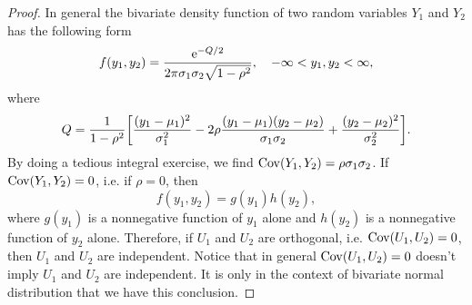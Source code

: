 \documentclass[10pt]{article}
\begin{document}
\begin{enumerate}
\begin{proof}
			In general the bivariate density function of two random variables $Y_1$ and $Y_2$ has the following form
			\begin{equation}
				f(y_1, y_2) = \frac{\e^{-Q/2}}{2\pi \sigma_1 \sigma_2 \sqrt{1-\rho^2}} \qc -\infty < y_1, y_2 < \infty,
			\end{equation}
			where
			\begin{equation}
				Q = \frac{1}{1-\rho^2} \bqty{\frac{(y_1 - \mu_1)^2}{\sigma_1^2} - 2\rho \frac{(y_1 - \mu_1)(y_2 - \mu_2)}{\sigma_1 \sigma_2} + \frac{(y_2 - \mu_2)^2}{\sigma_2^2}}.
			\end{equation}
			By doing a tedious integral exercise, we find $\operatorname{Cov}(Y_1, Y_2) = \rho \sigma_1 \sigma_2$. If $\operatorname{Cov}(Y_1, Y_2) = 0$, i.e. if $\rho = 0$, then
			\begin{equation}
				f(y_1, y_2) = g(y_1) h(y_2),
			\end{equation}
			where $g(y_1)$ is a nonnegative function of $y_1$ alone and $h(y_2)$ is a nonnegative function of $y_2$ alone. Therefore, if $U_1$ and $U_2$ are orthogonal, i.e. $\operatorname{Cov}(U_1, U_2) = 0$, then $U_1$ and $U_2$ are independent. Notice that in general $\operatorname{Cov}(U_1, U_2) = 0$ doesn't imply $U_1$ and $U_2$ are independent. It is only in the context of bivariate normal distribution that we have this conclusion.
		\end{proof}
	\end{enumerate}
\end{document}
